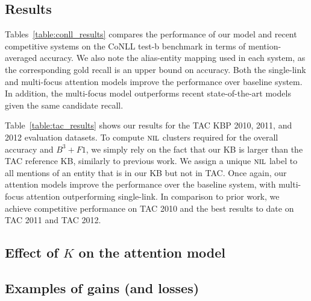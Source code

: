 \subsection{Results}

Tables~\ref{table:conll_results} compares the performance of our model
and recent competitive systems on the CoNLL test-b benchmark
 in terms of mention-averaged accuracy. We also note the alias-entity
 mapping used in each system, as the corresponding gold recall is
 an upper bound on accuracy. Both the single-link and multi-focus attention models
 improve the performance over baseline system. In addition, the multi-focus model
 outperforms recent state-of-the-art models given the same candidate recall.

Table~\ref{table:tac_results} shows our results for the TAC KBP 2010, 2011, and 2012
evaluation datasets. To compute $\mbox{\textsc{nil}}$ clusters required for the overall accuracy
and $B^3+F1$, we simply rely on the fact that our KB is larger than the TAC
reference KB, similarly to previous work. We assign a unique $\mbox{\textsc{nil}}$ label to
all mentions of an entity that is in our KB but not in TAC. 
Once again, our attention models improve the performance over the baseline
system, with multi-focus attention outperforming single-link. In comparison to
prior work, we achieve competitive performance on TAC 2010 and the best
results to date on TAC 2011 and TAC 2012.


\subsection{Effect of $K$ on the attention model}


\subsection{Examples of gains (and losses)}


%
%



